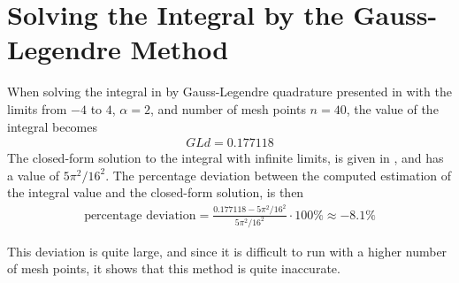 \section{Solving the Integral by the Gauss-Legendre Method}
\label{sec:ResultsGaussLegendreMethod}
When solving the integral in  by Gauss-Legendre quadrature presented in  with the limits from $-4$ to $4$, $\alpha = 2$, and number of mesh points $n=40$, the value of the integral becomes
\begin{align}
	GLd = 0.177118
\end{align}
The closed-form solution to the integral with infinite limits, is given in , and has a value of $5\pi^2 /16^2$.
The percentage deviation between the computed estimation of the integral value and the closed-form solution, is then
\begin{align}
	\text{percentage deviation} = \frac{0.177118 - 5\pi^2 /16^2}{5\pi^2 /16^2} \cdot 100 \% \approx -8.1 \%
\end{align}


This deviation is quite large, and since it is difficult to run with a higher number of mesh points, it shows that this method is quite inaccurate.  